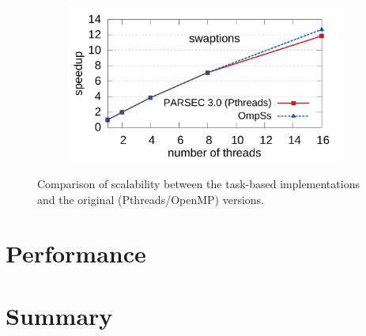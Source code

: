 \begin{figure}[ht]
				\centering
        \begin{subfigure}[b]{0.8\textwidth}
                \includegraphics[width=\textwidth]{task_benchmarks/figures/swaptions_scale}
                \label{fig:swaptions_scale}
        \end{subfigure}
      \caption{Comparison of scalability between the task-based implementations and the original (Pthreads/OpenMP) versions.}
			\label{fig:scalability_graphs_4}
			\vspace{.5cm}
\end{figure}





\section{Performance}
\label{sec:task_bench_evaluation}


\section{Summary}

